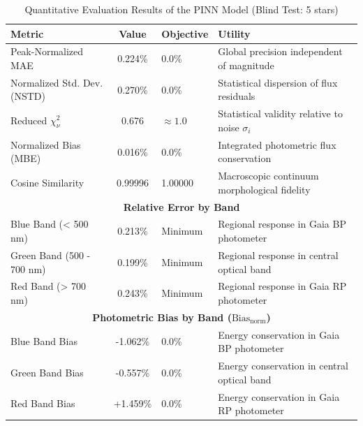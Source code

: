 
\begin{table}[htpb]
\centering
\caption{Quantitative Evaluation Results of the PINN Model (Blind Test: 5 stars)}
\label{tab:pinn_evaluation}
\begin{tabular}{lcll}
\hline
\textbf{Metric} & \textbf{Value} & \textbf{Objective} & \textbf{Utility} \\
\hline
Peak-Normalized MAE & 0.224\% & 0.0\% & Global precision independent of magnitude \\
Normalized Std. Dev. (NSTD) & 0.270\% & 0.0\% & Statistical dispersion of flux residuals \\
Reduced $\chi^2_\nu$ & 0.676 & $\approx 1.0$ & Statistical validity relative to noise $\sigma_i$ \\
Normalized Bias (MBE) & 0.016\% & 0.0\% & Integrated photometric flux conservation \\
Cosine Similarity & 0.99996 & 1.00000 & Macroscopic continuum morphological fidelity \\
\hline
\multicolumn{4}{c}{\textbf{Relative Error by Band}} \\
\hline
Blue Band (< 500 nm) & 0.213\% & Minimum & Regional response in Gaia BP photometer \\
Green Band (500 - 700 nm) & 0.199\% & Minimum & Regional response in central optical band \\
Red Band (> 700 nm) & 0.243\% & Minimum & Regional response in Gaia RP photometer \\
\hline
\multicolumn{4}{c}{\textbf{Photometric Bias by Band ($\text{Bias}_{\text{norm}}$)}} \\
\hline
Blue Band Bias & -1.062\% & 0.0\% & Energy conservation in Gaia BP photometer \\
Green Band Bias & -0.557\% & 0.0\% & Energy conservation in central optical band \\
Red Band Bias & +1.459\% & 0.0\% & Energy conservation in Gaia RP photometer \\
\hline
\end{tabular}
\end{table}
